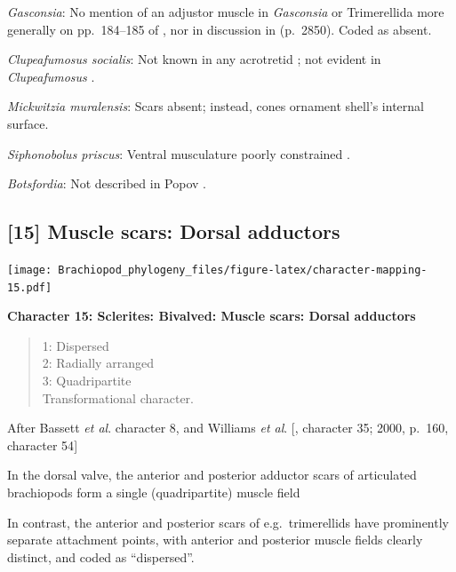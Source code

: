 \documentclass[openany]{book}
\theoremstyle{definition}
\theoremstyle{definition}
\theoremstyle{definition}
\theoremstyle{remark}
\begin{document}
\emph{Gasconsia}: No mention of an adjustor muscle in \emph{Gasconsia}
or Trimerellida more generally on pp.~184--185 of
\citet{Williams2000BrachiopodaLinguliformea}, nor in discussion in
\citet{Williams2007PartH} (p.~2850). Coded as absent.

\emph{Clupeafumosus socialis}: Not known in any acrotretid
\citep{Williams2000BrachiopodaLinguliformea}; not evident in
\emph{Clupeafumosus} \citep{Topper2013Reappraisalof}.

\emph{Mickwitzia muralensis}: Scars absent; instead, cones ornament
shell's internal surface.

\emph{Siphonobolus priscus}: Ventral musculature poorly constrained
\citep{Williams2000BrachiopodaLinguliformea, Popov2009Earlyontogeny}.

\emph{Botsfordia}: Not described in Popov
\citeyearpar{Popov1992TheCambrian}.

\hypertarget{muscle-scars-dorsal-adductors}{%
\subsection*{{[}15{]} Muscle scars: Dorsal
adductors}\label{muscle-scars-dorsal-adductors}}

\texttt{[image: Brachiopod\_phylogeny\_files/figure-latex/character-mapping-15.pdf]}

\textbf{Character 15: Sclerites: Bivalved: Muscle scars: Dorsal
adductors}

\begin{quote}
1: Dispersed\\
2: Radially arranged\\
3: Quadripartite\\
Transformational character.
\end{quote}

After Bassett \emph{et al}.
\citeyearpar{Bassett2001Functionalmorphology} character 8, and Williams
\emph{et al}. {[}\citeyearpar{Williams1996Asupra}, character 35; 2000,
p.~160, character 54{]}

In the dorsal valve, the anterior and posterior adductor scars of
articulated brachiopods form a single (quadripartite) muscle field
\citep[p.~201]{Williams2000BrachiopodaLinguliformea}

In contrast, the anterior and posterior scars of e.g.~trimerellids have
prominently separate attachment points, with anterior and posterior
muscle fields clearly distinct, and coded as ``dispersed''.
\end{document}
